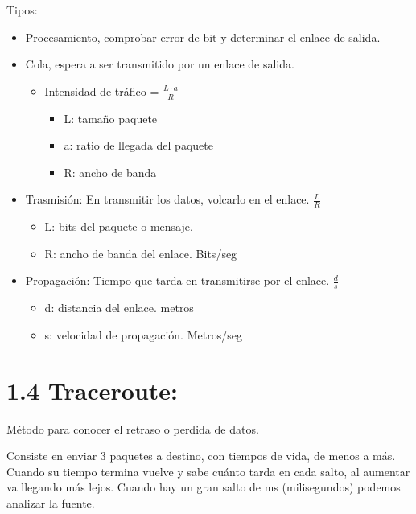 \documentclass[12pt, twoside, openright]{report} %
\begin{document}
  Tipos:

  \begin{itemize}
  \item
    Procesamiento, comprobar error de bit y determinar el enlace de
    salida.
  \item
    Cola, espera a ser transmitido por un enlace de salida.

    \begin{itemize}
    \item
      Intensidad de tráfico = \(\frac{L\cdot a}{R}\)

      \begin{itemize}
      \item
        L: tamaño paquete
      \item
        a: ratio de llegada del paquete
      \item
        R: ancho de banda
      \end{itemize}
    \end{itemize}
  \item
    Trasmisión: En transmitir los datos, volcarlo en el enlace.
    \(\frac{L}{R}\)

    \begin{itemize}
    \item
      L: bits del paquete o mensaje.
    \item
      R: ancho de banda del enlace. Bits/seg
    \end{itemize}
  \item
    Propagación: Tiempo que tarda en transmitirse por el enlace.
    \(\frac{d}{s}\)

    \begin{itemize}
    \item
      d: distancia del enlace. metros
	\item
	  s: velocidad de propagación. Metros/seg
    \end{itemize}
  
  \end{itemize}

\section{1.4 Traceroute:}

  Método para conocer el retraso o perdida de datos.

  Consiste en enviar 3 paquetes a destino, con tiempos de vida, de menos
  a más. Cuando su tiempo termina vuelve y sabe cuánto tarda en cada
  salto, al aumentar va llegando más lejos. Cuando hay un gran salto de
  ms (milisegundos) podemos analizar la fuente.
\end{document}
